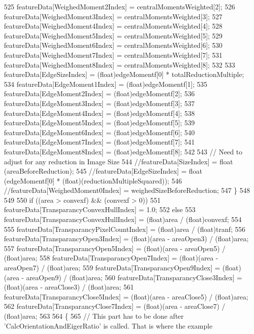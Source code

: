 \begin{DoxyCode}
525     featureData[WeighedMoment2Index] = centralMomentsWeighted[2];
526     featureData[WeighedMoment3Index] = centralMomentsWeighted[3];
527     featureData[WeighedMoment4Index] = centralMomentsWeighted[4];
528     featureData[WeighedMoment5Index] = centralMomentsWeighted[5];
529     featureData[WeighedMoment6Index] = centralMomentsWeighted[6];
530     featureData[WeighedMoment7Index] = centralMomentsWeighted[7];
531     featureData[WeighedMoment8Index] = centralMomentsWeighted[8];
532 
533     featureData[EdgeSizeIndex]    = (float)edgeMomentf[0] * totalReductionMultiple;
534     featureData[EdgeMoment1Index] = (float)edgeMomentf[1];
535     featureData[EdgeMoment2Index] = (float)edgeMomentf[2];
536     featureData[EdgeMoment3Index] = (float)edgeMomentf[3];
537     featureData[EdgeMoment4Index] = (float)edgeMomentf[4];
538     featureData[EdgeMoment5Index] = (float)edgeMomentf[5];
539     featureData[EdgeMoment6Index] = (float)edgeMomentf[6];
540     featureData[EdgeMoment7Index] = (float)edgeMomentf[7];
541     featureData[EdgeMoment8Index] = (float)edgeMomentf[8];
542 
543     \textcolor{comment}{// Need to adjust for any reduction in Image Size}
544     \textcolor{comment}{//featureData[SizeIndex]           = float (areaBeforeReduction);}
545     \textcolor{comment}{//featureData[EdgeSizeIndex]       = float (edgeMomentf[0] * (float)(reductionMultipleSquared));}
546     \textcolor{comment}{//featureData[WeighedMoment0Index] = weighedSizeBeforeReduction;}
547   \}
548 
549 
550   \textcolor{keywordflow}{if} ((area > convexf)  &&  (convexf > 0))
551      featureData[TransparancyConvexHullIndex] = 1.0;
552   \textcolor{keywordflow}{else} 
553      featureData[TransparancyConvexHullIndex] = (float)area / (\textcolor{keywordtype}{float})convexf;
554 
555   featureData[TransparancyPixelCountIndex] = (float)area / (\textcolor{keywordtype}{float})tranf;
556   featureData[TransparancyOpen3Index]      = (float)(area - areaOpen3)  / (float)area;
557   featureData[TransparancyOpen5Index]      = (float)(area - areaOpen5)  / (float)area;
558   featureData[TransparancyOpen7Index]      = (float)(area - areaOpen7)  / (float)area;                
559   featureData[TransparancyOpen9Index]      = (float)(area - areaOpen9)  / (float)area;
560   featureData[TransparancyClose3Index]     = (float)(area - areaClose3) / (float)area;
561   featureData[TransparancyClose5Index]     = (float)(area - areaClose5) / (float)area;
562   featureData[TransparancyClose7Index]     = (float)(area - areaClose7) / (float)area;
563  
564   \{
565     \textcolor{comment}{// This part has to be done after 'CalcOrientationAndEigerRatio' is called. That is where the example
}
\end{DoxyCode}
